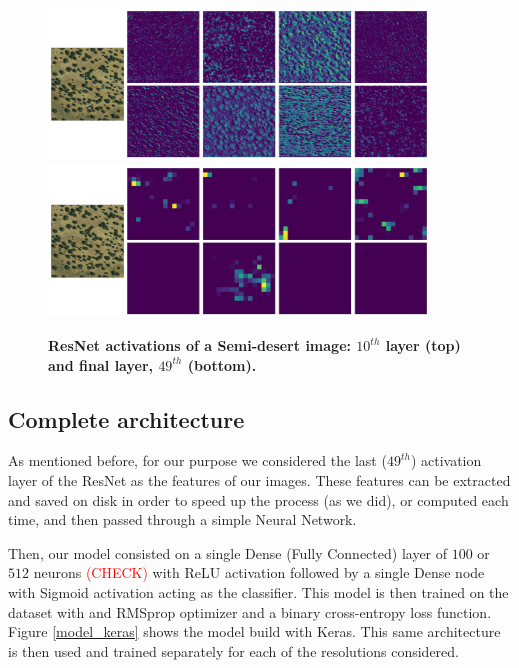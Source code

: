 \begin{figure}[h!]
	\centering
	\includegraphics[width=0.9\textwidth]{Figures/activations/semi-desert_l0_s1_activation_10.png}
	\includegraphics[width=0.9\textwidth]{Figures/activations/semi-desert_l0_s1_activation_49.png}
	\captionsetup{width=1\linewidth}
	\caption{\textbf{ResNet activations of a Semi-desert image: $10^{th}$ layer (top) and final layer, $49^{th}$ (bottom).}}
	\label{fig:act_semi_desert}
\end{figure}

\subsection{Complete architecture}

As mentioned before, for our purpose we considered the last ($49^{th}$) activation layer of the ResNet as the features of our images. These features can be extracted and saved on disk in order to speed up the process (as we did), or computed each time, and then passed through a simple Neural Network.

Then, our model consisted on a single Dense (Fully Connected) layer of $100$ or $512$ neurons \textcolor{red}{(CHECK)} with ReLU activation followed by a single Dense node with Sigmoid activation acting as the classifier. This model is then trained on the dataset with and RMSprop optimizer and a binary cross-entropy loss function. Figure \ref{model_keras} shows the model build with Keras. This same architecture is then used and trained separately for each of the resolutions considered.

